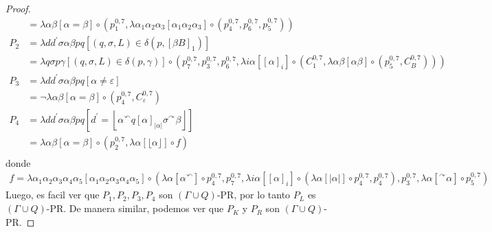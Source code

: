 \begin{proof}
\begin{align*}
          &=  \lambda \alpha\beta\left[ \alpha=\beta \right]
                \circ (
                  p_{1}^{0,7},
                  \lambda \alpha_1 \alpha_2 \alpha_3 \left[ \alpha_1\alpha_2\alpha_3 \right]
                    \circ (
                      p_{4}^{0,7},
                      p_{6}^{0,7},
                      p_{5}^{0,7}
                    )
                  ) \\[10pt]
      P_2 &=  \lambda d d^{\prime}\sigma\alpha\beta p q
                \left[ (q,\sigma ,L)\in \delta \left( p,\left[ \beta B\right] _{1}\right) \right] \\
          &=  \lambda q\sigma p\gamma \left[ (q,\sigma ,L)\in \delta (p,\gamma )\right]
                \circ (
                  p_{7}^{0,7},
                  p_{3}^{0,7},
                  p_{6}^{0,7},
                  \lambda i\alpha \left[ \left[\alpha\right]_i \right]
                  \circ (
                    C_{1}^{0,7},
                    \lambda \alpha \beta \left[ \alpha\beta \right] \circ (p_{5}^{0,7}, C_{B}^{0,7})
                  )
                ) \\[10pt]
      P_3 &=  \lambda d d^{\prime}\sigma\alpha\beta p q \left[ \alpha \neq \varepsilon \right] \\
          &=  \neg \lambda \alpha\beta \left[ \alpha = \beta \right]
              \circ (
                p_{4}^{0,7},
                C_{\varepsilon}^{0,7}
              ) \\[10pt]
      P_4 &=  \lambda d d^{\prime}\sigma\alpha\beta p q
                \left[
                  d^{\prime } = \left\lfloor \alpha ^{\curvearrowleft }q\left[ \alpha \right]
                  _{\left\vert \alpha \right\vert }\sigma ^{\curvearrowright }\beta \right\rfloor
                \right] \\
          &=  \lambda \alpha\beta\left[ \alpha=\beta \right]
                \circ (
                  p_{2}^{0,7},
                  \lambda \alpha \left[ \lfloor \alpha \rfloor \right] \circ f
                ) \\
    \end{align*}
    donde
    \begin{align*}
      f =  \lambda\alpha_1\alpha_2\alpha_3\alpha_4\alpha_5 \left[ \alpha_1\alpha_2\alpha_3\alpha_4\alpha_5 \right]
            \circ (
              \lambda \alpha \left[ \alpha ^{\curvearrowleft } \right] \circ p_{4}^{0,7},
              p_{7}^{0,7},
              \lambda i\alpha \left[ \left[\alpha\right]_i \right]
                \circ (
                  \lambda \alpha \left[ |\alpha| \right] \circ p_{4}^{0,7},
                  p_{4}^{0,7}
              ),
              p_{3}^{0,7},
              \lambda \alpha \left[ ^{\curvearrowright}\alpha \right] \circ p_{5}^{0,7}
            )
    \end{align*}
    Luego, es facil ver que $P_1, P_2 , P_3, P_4 $ son $(\Gamma \cup Q)$-PR, por lo tanto $P_L$ es $(\Gamma \cup Q)$-PR.
    De manera similar, podemos ver que $P_K$ y $P_R$ son $(\Gamma \cup Q)$-PR.


\end{proof}
